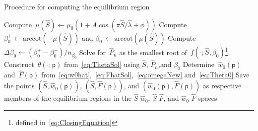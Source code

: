 \documentclass[preprint,10pt,times]{elsarticle}
\numberwithin{equation}{section}
\newcommand{\pr}[1]{\left( #1 \right)}
\newcommand{\idp}{\mathsf{p}}
\begin{document}
\begin{algorithm}[ht!]
\caption{Procedure for computing the equilibrium region}
\label{algo:equilibrium}
\noindent\begin{minipage}{\textwidth}\renewcommand\footnoterule{}
\begin{algorithmic}[1]
\State Compute~$\mu\pr{\hat{S}}\leftarrow\mu_{0}\left(1+A\cos\left(\pi\hat{S}/\hat{\lambda}+\phi\right)\right)$
\State Compute~$\beta_{0}^+\leftarrow\text{arccot}\pr{-\mu\pr{\hat{S}}} $ and $\beta_{0}^-\leftarrow\text{arccot}\pr{\mu\pr{\hat{S}}} $
\State Compute~$\Delta\beta_0\leftarrow\pr{\beta_0^+ -\beta_0^-}/n_{\beta_0}$
\State Solve for~$\hat{P}_{n}$ as the smallest root of~$f(\cdot;\hat{S},\beta_{0})$\footnote{defined in~\eqref{eq:ClosingEquation}}
\State Construct~$\theta(\cdot;\idp)$ from~\eqref{eq:ThetaSol} using $\hat{S}$, $\hat{P}_{n}$,and $\beta_0$
\State Determine~$\hat{w}_0(\idp)$ and~$\hat{F}(\idp)$ from~\eqref{eq:w0hat},~\eqref{eq:FhatSol},~\eqref{eq:omegaNew} and~\eqref{eq:Theta0}
\State Save the points $(\hat{S},\hat{w}_0(\idp))$, $(\hat{S},\hat{F}(\idp))$, and $(\hat{w}_0(\idp),\hat{F}(\idp))$ as respective members of the equilibrium regions in the $\hat{S}$-$\hat{w}_0$, $\hat{S}$-$\hat{F}$, and $\hat{w}_0$-$\hat{F}$ spaces
\EndFor
\EndFor
{}
\end{algorithmic}
\end{minipage}
\end{algorithm}
\end{document}
